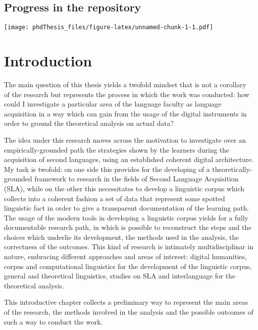 \documentclass[a4paper,twoside,12pt,chapterprefix=false,bibliography=totocnumbered,listof=flat]{scrbook}
\theoremstyle{definition}
\theoremstyle{definition}
\theoremstyle{definition}
\theoremstyle{remark}
\begin{document}
\section*{Progress in the repository}\label{progress-in-the-repository}

\texttt{[image: phdThesis\_files/figure-latex/unnamed-chunk-1-1.pdf]}

\mainmatter

\chapter{Introduction}\label{introduction}

The main question of this thesis yields a twofold mindset that is not a
corollary of the research but represents the process in which the work
was conducted: how could I investigate a particular area of the language
faculty as language acquisition in a way which can gain from the usage
of the digital instruments in order to ground the theoretical analysis
on actual data?

The idea under this research moves across the motivation to investigate
over an empirically-grounded path the strategies shown by the learners
during the acquisition of second languages, using an established
coherent digital architecture. My task is twofold: on one side this
provides for the developing of a theoretically-grounded framework to
research in the fields of Second Language Acquisition (SLA), while on
the other this necessitates to develop a linguistic corpus which
collects into a coherent fashion a set of data that represent some
spotted linguistic fact in order to give a transparent documentation of
the learning path. The usage of the modern tools in developing a
linguistic corpus yields for a fully documentable research path, in
which is possible to reconstruct the steps and the choices which
underlie its development, the methods used in the analysis, the
correctness of the outcomes. This kind of research is intimately
multidisciplinar in nature, embracing different approaches and areas of
interest: digital humanities, corpus and computational linguistics for
the development of the linguistic corpus, general and theoretical
linguistics, studies on SLA and interlanguage for the theoretical
analysis.

This introductive chapter collects a preliminary way to represent the
main areas of the research, the methods involved in the analysis and the
possible outcomes of such a way to conduct the work.
\end{document}
